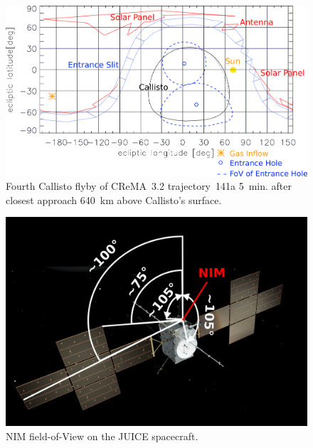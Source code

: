 	\begin{figure}[h!]
		\centering
		\includegraphics[width = .7\textwidth]{Bilder/NIM_pointing_2031JAN15195700.png}
		\caption{Fourth Callisto flyby of CReMA~3.2 trajectory~141a \cite{SOC_Crema3p2} 5~min. after closest approach 640~km above Callisto's surface.}
		\label{fig:FlybyCal1957}
	\end{figure}
	\begin{figure}[h!]
		\centering
		\includegraphics[width=.6\textwidth]{Bilder/SC_Angle.png}
		\caption{NIM field-of-View on the JUICE spacecraft.}
		\label{fig:SCFoV}
	\end{figure}

